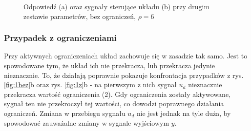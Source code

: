 \documentclass{article}
\begin{document}
\begin{figure}[H]
    \centering
    \caption{Odpowiedź (a) oraz sygnały sterujące układu (b) przy drugim zestawie parametrów, bez ograniczeń, $\rho=6$}
    \label{fig:4bez}
\end{figure}

\subsubsection{Przypadek z ograniczeniami}

Przy aktywnych ograniczeniach układ zachowuje się w zasadzie tak samo. Jest to spowodowane tym, że układ ich nie przekracza, lub przekracza jedynie nieznacznie. To, że działają poprawnie pokazuje konfrontacja przypadków z rys. \ref{fig:1bez}b oraz rys. \ref{fig:1z}b - na pierwszym z nich sygnał $u_d$ nieznacznie przekracza wartość ograniczenia (2). Gdy ograniczenia zostały aktywowane, sygnał ten nie przekroczył tej wartości, co dowodzi poprawnego działania ograniczeń. Zmiana w przebiegu sygnału $u_d$ nie jest jednak na tyle duża, by spowodować zauważalne zmiany w sygnale wyjściowym $y$.
\end{document}
